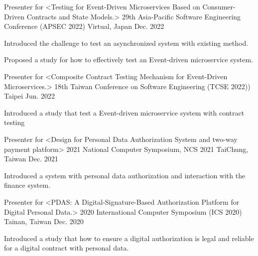 

\begin{cventries}

  \cventry
    {Presenter for <Testing for Event-Driven Microservices Based on Consumer-Driven Contracts and State Models.>} %
    {29th Asia-Pacific Software Engineering Conference (APSEC 2022)} %
    {Virtual, Japan} %
    {Dec. 2022} %
    {
      \begin{cvitems} %
        \item {Introduced the challenge to test an asynchronized system with existing method.}
        \item {Proposed a study for how to effectively test an Event-driven microservice system.}
      \end{cvitems}
    }

  \cventry
    {Presenter for <Composite Contract Testing Mechanism for Event-Driven Microservices.>} %
    {18th Taiwan Conference on Software Engineering (TCSE 2022))} %
    {Taipei} %
    {Jun. 2022} %
    {
      \begin{cvitems} %
        \item {Introduced a study that test a Event-driven microservice system with contract testing}
      \end{cvitems}
    }

  \cventry
    {Presenter for <Design for Personal Data Authorization System and two-way payment platform>} %
    {2021 National Computer Symposium, NCS 2021} %
    {TaiChung, Taiwan} %
    {Dec. 2021} %
    {
      \begin{cvitems} %
        \item {Introduced a system with personal data authorization and interaction with the finance system.}
      \end{cvitems}
    }

  \cventry
    {Presenter for <PDAS: A Digital-Signature-Based Authorization Platform for Digital Personal Data.>} %
    {2020 International Computer Symposium (ICS 2020)} %
    {Tainan, Taiwan} %
    {Dec. 2020} %
    {
      \begin{cvitems} %
        \item {Introduced a study that how to ensure a digital authorization is legal and reliable for a digital contract with personal data.}
      \end{cvitems}
    }

\pagebreak 
\end{cventries}
